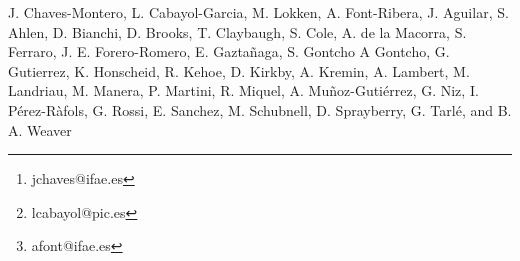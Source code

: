 \author{
J.~Chaves-Montero\inst{\ref{inst0}}\thanks{jchaves@ifae.es}
\and
L.~Cabayol-Garcia\inst{\ref{inst0},\ref{inst1}}\thanks{lcabayol@pic.es}
\and
M.~Lokken\inst{\ref{inst0}}
\and
A.~Font-Ribera\inst{\ref{inst0}}\thanks{afont@ifae.es}
\and
J.~Aguilar\inst{\ref{inst2}}
\and
S.~Ahlen\inst{\ref{inst3}}
\and
D.~Bianchi\inst{\ref{inst19}}
\and
D.~Brooks\inst{\ref{inst23}}
\and
T.~Claybaugh\inst{\ref{inst2}}
\and
S.~Cole\inst{\ref{inst6}}
\and
A.~de la Macorra\inst{\ref{inst37}}
\and
S.~Ferraro\inst{\ref{inst2},\ref{inst43}}
\and
J.~E.~Forero-Romero\inst{\ref{inst52},\ref{inst53}}
\and
E.~Gaztañaga\inst{\ref{inst55},\ref{inst27}}
\and
S.~Gontcho A Gontcho\inst{\ref{inst2}}
\and
G.~Gutierrez\inst{\ref{inst25}}
\and
K.~Honscheid\inst{\ref{inst33},\ref{inst46},\ref{inst47}}
\and
R.~Kehoe\inst{\ref{inst66}}
\and
D.~Kirkby\inst{\ref{inst14}}
\and
A.~Kremin\inst{\ref{inst2}}
\and
A.~Lambert\inst{\ref{inst2}}
\and
M.~Landriau\inst{\ref{inst2}}
\and
M.~Manera\inst{\ref{inst75},\ref{inst0}}
\and
P.~Martini\inst{\ref{inst33},\ref{inst65},\ref{inst47}}
\and
R.~Miquel\inst{\ref{inst77},\ref{inst0}}
\and
A.~Muñoz-Gutiérrez\inst{\ref{inst37}}
\and
G.~Niz\inst{\ref{inst36},\ref{inst11}}
\and
I.~P\'erez-R\`afols\inst{\ref{inst84}}
\and
G.~Rossi\inst{\ref{inst88}}
\and
E.~Sanchez\inst{\ref{inst38}}
\and
M.~Schubnell\inst{\ref{inst7}}
\and
D.~Sprayberry\inst{\ref{inst21}}
\and
G.~Tarl\'{e}\inst{\ref{inst7}}
\and
B.~A.~Weaver\inst{\ref{inst21}}
}

J. Chaves-Montero, L. Cabayol-Garcia, M. Lokken, A. Font-Ribera, J. Aguilar, S. Ahlen, D. Bianchi, D. Brooks, T. Claybaugh, S. Cole, A. de la Macorra, S. Ferraro, J. E. Forero-Romero, E. Gaztañaga, S. Gontcho A Gontcho, G. Gutierrez, K. Honscheid, R. Kehoe, D. Kirkby, A. Kremin, A. Lambert, M. Landriau, M. Manera, P. Martini, R. Miquel, A. Muñoz-Gutiérrez, G. Niz, I. Pérez-Ràfols, G. Rossi, E. Sanchez, M. Schubnell, D. Sprayberry, G. Tarlé, and B. A. Weaver

